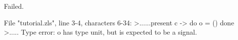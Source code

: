 \chklistingfalse
{}
\begin{ChkListingMsg}
Failed.
\end{ChkListingMsg}
\begin{ChkListingErr}
File "tutorial.zls", line 3-4, characters 6-34:
>......present c -> do o = () done
>.....
Type error: o has type
unit, but is expected to be a signal.
\end{ChkListingErr}
